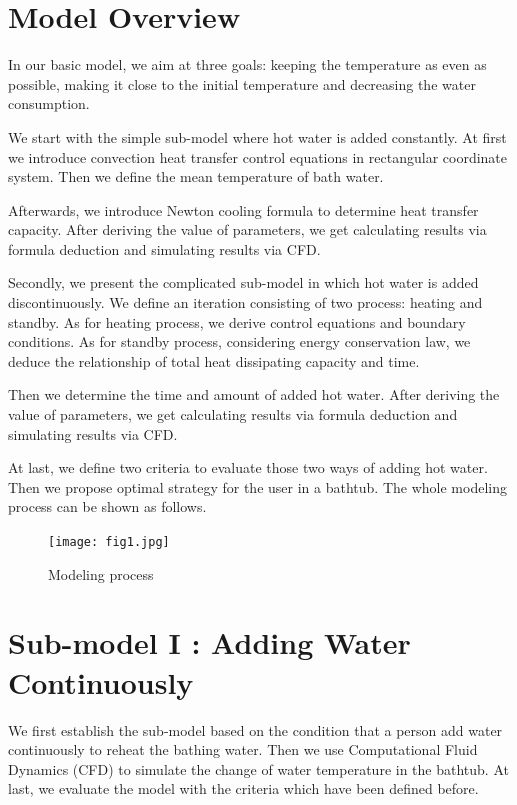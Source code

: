 \documentclass{mcmthesis}
\begin{document}
\section{Model Overview}

In our basic model, we aim at three goals: keeping the temperature as even as possible, making it close to the initial temperature and decreasing the water consumption.

We start with the simple sub-model where hot water is added constantly.
At first we introduce convection heat transfer control equations in rectangular coordinate system. Then we define the mean temperature of bath water.

Afterwards, we introduce Newton cooling formula to determine heat transfer
capacity. After deriving the value of parameters, we get calculating results via formula deduction and simulating results via CFD.

Secondly, we present the complicated sub-model in which hot water is
added discontinuously. We define an iteration consisting of two process:
heating and standby. As for heating process, we derive control equations and boundary conditions. As for standby process, considering energy conservation law, we deduce the relationship of total heat dissipating capacity and time.

Then we determine the time and amount of added hot water. After deriving the value of parameters, we get calculating results via formula deduction and simulating results via CFD.

At last, we define two criteria to evaluate those two ways of adding hot water. Then we propose optimal strategy for the user in a bathtub.
The whole modeling process can be shown as follows.

\begin{figure}[h] 
\centering
\texttt{[image: fig1.jpg]}
\caption{Modeling process} \label{fig1}
\end{figure}

\section{Sub-model I : Adding Water Continuously}

We first establish the sub-model based on the condition that a person add water continuously to reheat the bathing water. Then we use Computational Fluid Dynamics (CFD) to simulate the change of water temperature in the bathtub. At last, we evaluate the model with the criteria which have been defined before.
\end{document}
